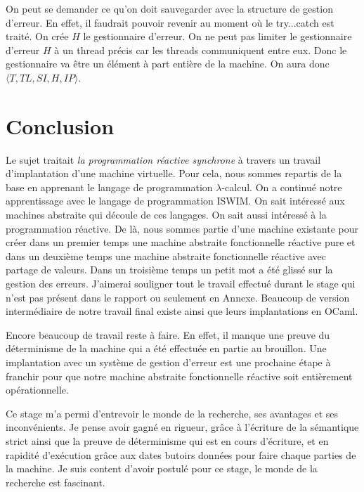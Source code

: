 \documentclass[10pt,a4paper]{article}
\begin{document}
					On peut se demander ce qu'on doit sauvegarder avec la structure de gestion d'erreur. En effet, il faudrait pouvoir revenir au moment où le try...catch est traité. On crée $H$ le gestionnaire d'erreur. On ne peut pas limiter le gestionnaire d'erreur $H$ à un thread précis car les threads communiquent entre eux. Donc le gestionnaire va être un élément à part entière de la machine. On aura donc $\langle T,TL,SI,H,IP\rangle$.
					
					
				
				\newpage
				
				
				
	\section{Conclusion}
		
		Le sujet traitait \textit{la programmation réactive synchrone} à travers un travail d'implantation d'une machine virtuelle. Pour cela, nous sommes repartis de la base en apprenant le langage de programmation $\lambda$-calcul. On a continué notre apprentissage avec le langage de programmation ISWIM. On sait intéressé aux machines abstraite qui découle de ces langages. On sait aussi intéressé à la programmation réactive. De là, nous sommes partie d'une machine existante pour créer dans un premier temps une machine abstraite fonctionnelle réactive pure et dans un deuxième temps une machine abstraite fonctionnelle réactive avec partage de valeurs. Dans un troisième temps un petit mot a été glissé sur la gestion des erreurs. J'aimerai souligner tout le travail effectué durant le stage qui n'est pas présent dans le rapport ou seulement en Annexe. Beaucoup de version intermédiaire de notre travail final existe ainsi que leurs implantations en OCaml. 
		\medbreak
		
		Encore beaucoup de travail reste à faire. En effet, il manque une preuve du déterminisme de la machine qui a été effectuée en partie au brouillon. Une implantation avec un système de gestion d'erreur est une prochaine étape à franchir pour que notre machine abstraite fonctionnelle réactive soit entièrement opérationnelle.
		\medbreak
		
		Ce stage m'a permi d'entrevoir le monde de la recherche, ses avantages et ses inconvénients. Je pense avoir gagné en rigueur, grâce à l'écriture de la sémantique strict ainsi que la preuve de déterminisme qui est en cours d'écriture, et en rapidité d'exécution grâce aux dates butoirs données pour faire chaque parties de la machine. Je suis content d'avoir postulé pour ce stage, le monde de la recherche est fascinant.
		\newpage
		
\end{document}

